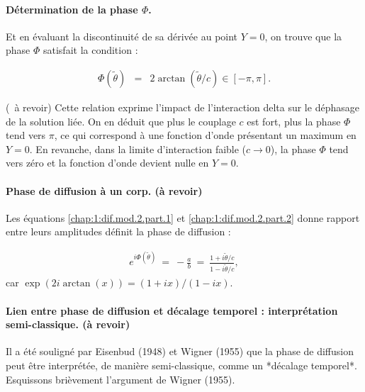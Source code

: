 
\paragraph{Détermination de la phase $\Phi$.}
Et en évaluant la discontinuité de sa dérivée au point $Y = 0$, on trouve que la phase $\Phi$ satisfait la condition :


\begin{eqnarray*}
	\Phi(\tilde{\theta}) & = & 2 \arctan (\tilde{\theta}/c) \in [ - \pi , \pi ]\label{chap:1:dif.mod.2.part.2} .
\end{eqnarray*}

{\color{red}( à revoir)} Cette relation exprime l’impact de l’interaction delta sur le déphasage de la solution liée. On en déduit que plus le couplage $c$ est fort, plus la phase $\Phi$ tend vers $\pi$, ce qui correspond à une fonction d’onde présentant un maximum en $Y = 0$. En revanche, dans la limite d’interaction faible ($c \to 0$), la phase $\Phi$ tend vers zéro et la fonction d’onde devient nulle en $Y = 0$.

\paragraph{Phase de diffusion à un corp. {\color{red}(à revoir)}}
Les équations \eqref{chap:1:dif.mod.2.part.1} et \eqref{chap:1:dif.mod.2.part.2} donne rapport entre leurs amplitudes définit la phase de diffusion :

\begin{eqnarray}\label{chap:1:dif.mod.2.part.3}
	e^{i\Phi ( \tilde{\theta}  ) }~=~ -\frac{a}{b} ~=~\frac{1 +i\tilde{\theta}/c} { 1 - i\tilde{\theta}/c} , 
\end{eqnarray}
car $\exp(2i\arctan(x)) = (1 + ix)/(1 - ix)$.

\paragraph{Lien entre phase de diffusion et décalage temporel : interprétation semi-classique. {\color{red}(à revoir)}}

Il a été souligné par {\color{blue}Eisenbud (1948)} et {\color{blue}Wigner (1955)} que la phase de diffusion peut être interprétée, de manière semi-classique, comme un *décalage temporel*. Esquissons brièvement l'argument de {\color{blue}Wigner (1955)}.

